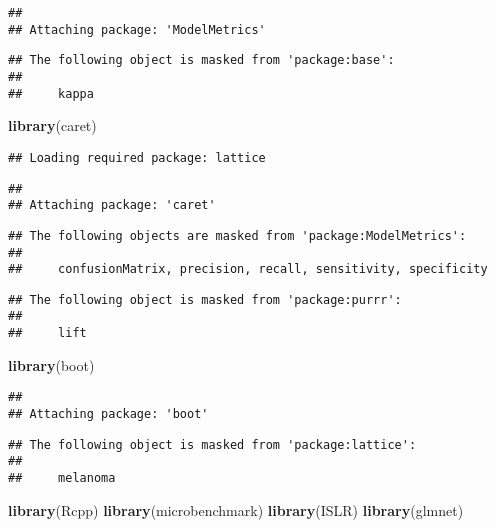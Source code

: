 \documentclass[]{article}
\newenvironment{Shaded}{\begin{snugshade}}{\end{snugshade}}
\newcommand{\KeywordTok}[1]{\textcolor[rgb]{0.13,0.29,0.53}{\textbf{#1}}}
\newcommand{\NormalTok}[1]{#1}
\begin{document}
\begin{verbatim}
## 
## Attaching package: 'ModelMetrics'
\end{verbatim}

\begin{verbatim}
## The following object is masked from 'package:base':
## 
##     kappa
\end{verbatim}

\begin{Shaded}
\begin{Highlighting}[]
\KeywordTok{library}\NormalTok{(caret)}
\end{Highlighting}
\end{Shaded}

\begin{verbatim}
## Loading required package: lattice
\end{verbatim}

\begin{verbatim}
## 
## Attaching package: 'caret'
\end{verbatim}

\begin{verbatim}
## The following objects are masked from 'package:ModelMetrics':
## 
##     confusionMatrix, precision, recall, sensitivity, specificity
\end{verbatim}

\begin{verbatim}
## The following object is masked from 'package:purrr':
## 
##     lift
\end{verbatim}

\begin{Shaded}
\begin{Highlighting}[]
\KeywordTok{library}\NormalTok{(boot)}
\end{Highlighting}
\end{Shaded}

\begin{verbatim}
## 
## Attaching package: 'boot'
\end{verbatim}

\begin{verbatim}
## The following object is masked from 'package:lattice':
## 
##     melanoma
\end{verbatim}

\begin{Shaded}
\begin{Highlighting}[]
\KeywordTok{library}\NormalTok{(Rcpp)}
\KeywordTok{library}\NormalTok{(microbenchmark)}
\KeywordTok{library}\NormalTok{(ISLR)}
\KeywordTok{library}\NormalTok{(glmnet)}
\end{Highlighting}
\end{Shaded}
\end{document}
